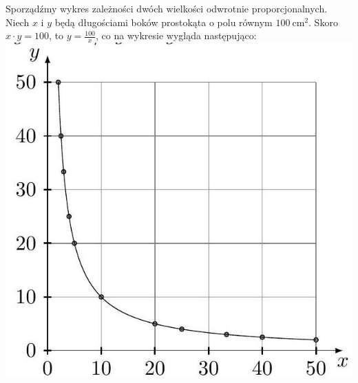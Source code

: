 \documentclass[10pt]{article}
\begin{document}
Sporządźmy wykres zależności dwóch wielkości odwrotnie proporcjonalnych. Niech \(x\) i \(y\) będą długościami boków prostokąta o polu równym \(100 \mathrm{~cm}^{2}\). Skoro \(x \cdot y=100\), to \(y=\frac{100}{x}\), co na wykresie wygląda następująco:\\
\includegraphics[max width=\textwidth, center]{2024_11_21_e9b4faa005d5be2cc318g-135}
\end{document}
